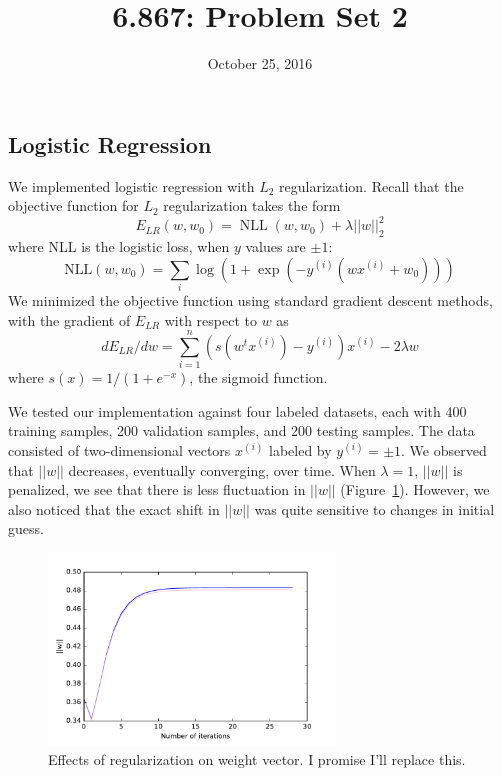 \documentclass{article}
\title{6.867: Problem Set 2}
\date{October 25, 2016}
\DeclareMathOperator{\NLL}{NLL}
\newcommand{\sind}[1]{^{(#1)}}
\begin{document}
\maketitle

\begin{multicols}{2}


\section{Logistic Regression}
\label{sec:lr}

We implemented logistic regression with $L_2$ regularization.
Recall that the objective function for $L_2$ regularization takes the form
\begin{equation}
    E_{LR}(w, w_0) = \NLL(w, w_0) + \lambda ||w||_2^2
\end{equation}
where NLL is the logistic loss, when $y$ values are $\pm 1$:
\begin{equation}
    \text{NLL}(w, w_0) = \sum_i{\log(1+\exp(-y^{(i)}(wx^{(i)}+w_0)))}
\end{equation}
We minimized the objective function using standard gradient descent methods, with the gradient of $E_{LR}$ with respect to $w$ as
\begin{equation}
    d E_{LR} / d{w} = \sum_{i=1}^n(s(w^tx^{(i)})-y^{(i)})x^{(i)} - 2\lambda w
\end{equation}
where $s(x) = 1/(1+e^{-x})$, the sigmoid function.

We tested our implementation against four labeled datasets, each with 400 training samples, 200 validation samples, and 200 testing samples. The data consisted of two-dimensional vectors $x\sind{i}$ labeled by $y\sind{i} = \pm1$. We observed that $||w||$ decreases, eventually converging, over time. When $\lambda = 1$, $||w||$ is penalized, we see that there is less fluctuation in $||w||$ (Figure~\ref{fig:weight-regularization}). However, we also noticed that the exact shift in $||w||$ was quite sensitive to changes in initial guess.

\begin{figure}
   \centering
   \includegraphics[width=3in]{img/1-1-weights.pdf}
   \caption{Effects of regularization on weight vector. I promise I'll replace this.}
   \label{fig:weight-regularization}
\end{figure}


\end{multicols}
\end{document}
